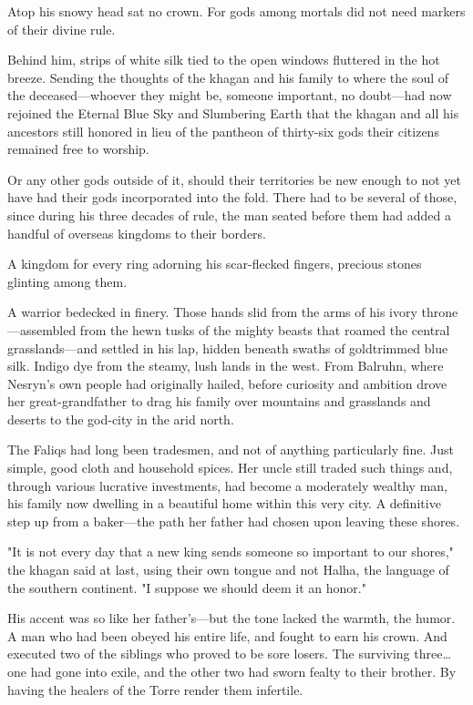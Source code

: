 Atop his snowy head sat no crown.
For gods among mortals did not need markers of their divine rule.

Behind him, strips of white silk tied to the open windows fluttered in the hot breeze.
Sending the thoughts of the khagan and his family to where the soul of the deceased---whoever they might be, someone important, no doubt---had now rejoined the Eternal Blue Sky and Slumbering Earth that the khagan and all his ancestors still honored in lieu of the pantheon of thirty-six gods their citizens remained free to worship.

Or any other gods outside of it, should their territories be new enough to not yet have had their gods incorporated into the fold.
There had to be several of those, since during his three decades of rule, the man seated before them had added a handful of overseas kingdoms to their borders.

A kingdom for every ring adorning his scar-flecked fingers, precious stones glinting among them.

A warrior bedecked in finery.
Those hands slid from the arms of his ivory throne---assembled from the hewn tusks of the mighty beasts that roamed the central grasslands---and settled in his lap, hidden beneath swaths of goldtrimmed blue silk.
Indigo dye from the steamy, lush lands in the west.
From Balruhn, where Nesryn's own people had originally hailed, before curiosity and ambition drove her great-grandfather to drag his family over mountains and grasslands and deserts to the god-city in the arid north.

The Faliqs had long been tradesmen, and not of anything particularly fine.
Just simple, good cloth and household spices.
Her uncle still traded such things and, through various lucrative investments, had become a moderately wealthy man, his family now dwelling in a beautiful home within this very city.
A definitive step up from a baker---the path her father had chosen upon leaving these shores.

"It is not every day that a new king sends someone so important to our shores," the khagan said at last, using their own tongue and not Halha, the language of the southern continent.
"I suppose we should deem it an honor."

His accent was so like her father's---but the tone lacked the warmth, the humor.
A man who had been obeyed his entire life, and fought to earn his crown.
And executed two of the siblings who proved to be sore losers.
The surviving three\ldots one had gone into exile, and the other two had sworn fealty to their brother.
By having the healers of the Torre render them infertile.


